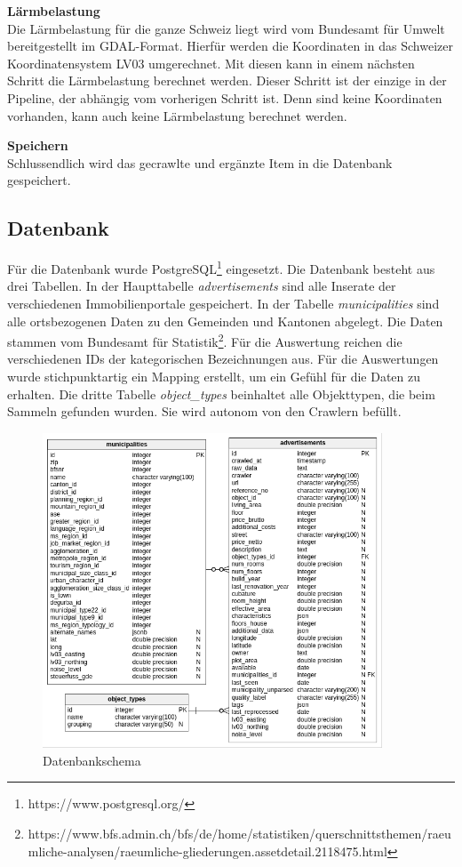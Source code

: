 %
\textbf{Lärmbelastung}\\
Die Lärmbelastung für die ganze Schweiz liegt wird vom Bundesamt für Umwelt bereitgestellt im GDAL-Format. Hierfür werden die Koordinaten in das Schweizer Koordinatensystem LV03 umgerechnet. Mit diesen kann in einem nächsten Schritt die Lärmbelastung berechnet werden. Dieser Schritt ist der einzige in der Pipeline, der abhängig vom vorherigen Schritt ist. Denn sind keine Koordinaten vorhanden, kann auch keine Lärmbelastung berechnet werden.

\textbf{Speichern}\\
Schlussendlich wird das gecrawlte und ergänzte Item in die Datenbank gespeichert.

\subsection{Datenbank}
Für die Datenbank wurde PostgreSQL\footnote{https://www.postgresql.org/} eingesetzt. Die Datenbank besteht aus drei Tabellen. In der Haupttabelle \textit{advertisements} sind alle Inserate der verschiedenen Immobilienportale gespeichert. In der Tabelle \textit{municipalities} sind alle ortsbezogenen Daten zu den Gemeinden und Kantonen abgelegt. Die Daten stammen vom Bundesamt für Statistik\footnote{https://www.bfs.admin.ch/bfs/de/home/statistiken/querschnittsthemen/raeumliche-analysen/raeumliche-gliederungen.assetdetail.2118475.html}. Für die Auswertung reichen die verschiedenen IDs der kategorischen Bezeichnungen aus. Für die Auswertungen wurde stichpunktartig ein Mapping erstellt, um ein Gefühl für die Daten zu erhalten.
Die dritte Tabelle \textit{object\_types} beinhaltet alle Objekttypen, die beim Sammeln gefunden wurden. Sie wird autonom von den Crawlern befüllt.

\begin{figure}[h]
\centering
\includegraphics[width=0.9\textwidth]{images/erm.png}
\caption[Datenbankschema]{Datenbankschema}%
\label{fig:db}
\end{figure}

